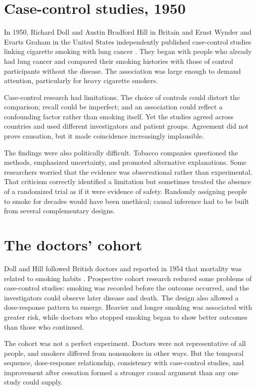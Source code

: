 \documentclass[12pt,oneside]{book}
\begin{document}
\section{Case-control studies, 1950}
In 1950, Richard Doll and Austin Bradford Hill in Britain and Ernst Wynder and
Evarts Graham in the United States independently published case-control studies
linking cigarette smoking with lung cancer \cite{doll1950}. They began with
people who already had lung cancer and compared their smoking histories with
those of control participants without the disease. The association was large
enough to demand attention, particularly for heavy cigarette smokers.

Case-control research had limitations. The choice of controls could distort the
comparison; recall could be imperfect; and an association could reflect a
confounding factor rather than smoking itself. Yet the studies agreed across
countries and used different investigators and patient groups. Agreement did
not prove causation, but it made coincidence increasingly implausible.

The findings were also politically difficult. Tobacco companies questioned the
methods, emphasized uncertainty, and promoted alternative explanations. Some
researchers worried that the evidence was observational rather than experimental.
That criticism correctly identified a limitation but sometimes treated the
absence of a randomized trial as if it were evidence of safety. Randomly
assigning people to smoke for decades would have been unethical; causal
inference had to be built from several complementary designs.

\section{The doctors' cohort}
Doll and Hill followed British doctors and reported in 1954 that mortality was
related to smoking habits \cite{dollhill1954}. Prospective cohort research
reduced some problems of case-control studies: smoking was recorded before the
outcome occurred, and the investigators could observe later disease and death.
The design also allowed a dose-response pattern to emerge. Heavier and longer
smoking was associated with greater risk, while doctors who stopped smoking
began to show better outcomes than those who continued.

The cohort was not a perfect experiment. Doctors were not representative of all
people, and smokers differed from nonsmokers in other ways. But the temporal
sequence, dose-response relationship, consistency with case-control studies,
and improvement after cessation formed a stronger causal argument than any one
study could supply.
\end{document}
